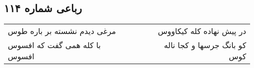 \begin{center}
\section*{رباعی شماره ۱۱۴}
\label{sec:sh114}
\begin{longtable}{l p{0.5cm} r}
مرغی دیدم نشسته بر باره طوس
&&
در پیش نهاده کله کیکاووس
\\
با کله همی گفت که افسوس افسوس
&&
کو بانگ جرسها و کجا ناله کوس
\\
\end{longtable}
\end{center}
